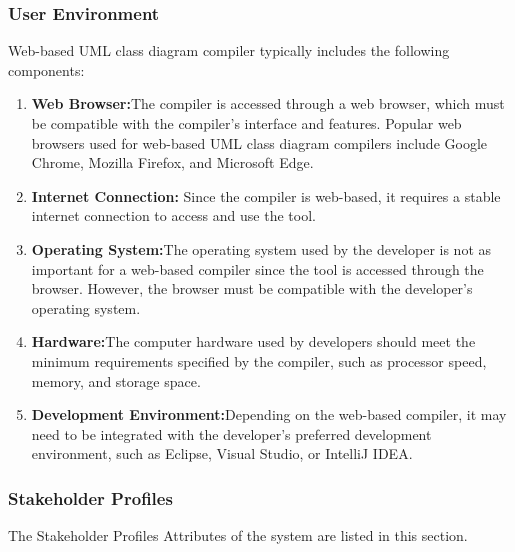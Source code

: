\documentclass[12pt,a4paper]{article}
\begin{document}
\subsubsection{User Environment}
Web-based UML class diagram compiler typically includes the following components:
\begin{enumerate}
    \item\textbf{ Web Browser:}The compiler is accessed through a web browser, which must be compatible with the compiler's interface and features. Popular web browsers used for web-based UML class diagram compilers include Google Chrome, Mozilla Firefox, and Microsoft Edge.
    \item \textbf{Internet Connection:} Since the compiler is web-based, it requires a stable internet connection to access and use the tool.
    \item\textbf{ Operating System:}The operating system used by the developer is not as important for a web-based compiler since the tool is accessed through the browser. However, the browser must be compatible with the developer's operating system.
    \item\textbf{ Hardware:}The computer hardware used by developers should meet the minimum requirements specified by the compiler, such as processor speed, memory, and storage space.
    \item \textbf{Development Environment:}Depending on the web-based compiler, it may need to be integrated with the developer's preferred development environment, such as Eclipse, Visual Studio, or IntelliJ IDEA.
\end{enumerate}

\newpage\subsubsection{Stakeholder Profiles}
The Stakeholder Profiles Attributes of the system are listed in this section.
\end{document}
